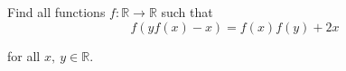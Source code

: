 Find all functions $f: \mathbb{R}\rightarrow \mathbb{R}$ such that$$f(yf(x)-x)=f(x)f(y)+2x$$

for all $x,\ y\in{\mathbb{R}}$.